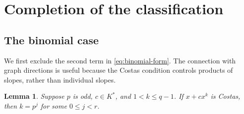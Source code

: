 \documentclass[11pt]{article}
\newtheorem{lemma}[theorem]{Lemma}
\theoremstyle{definition}
\theoremstyle{remark}
\numberwithin{equation}{section}
\begin{document}
\section{Completion of the classification}
\label{sec:completion}

\subsection{The binomial case}

We first exclude the second term in \eqref{eq:binomial-form}.
The connection with graph directions is useful because the Costas
condition controls products of slopes, rather than individual slopes.

\begin{lemma}\label{lem:binomial}
Suppose \(p\) is odd, \(c\in K^*\), and \(1<k\le q-1\).
If \(x+cx^k\) is Costas, then \(k=p^j\) for some \(0\le j<r\).
\end{lemma}
\end{document}
